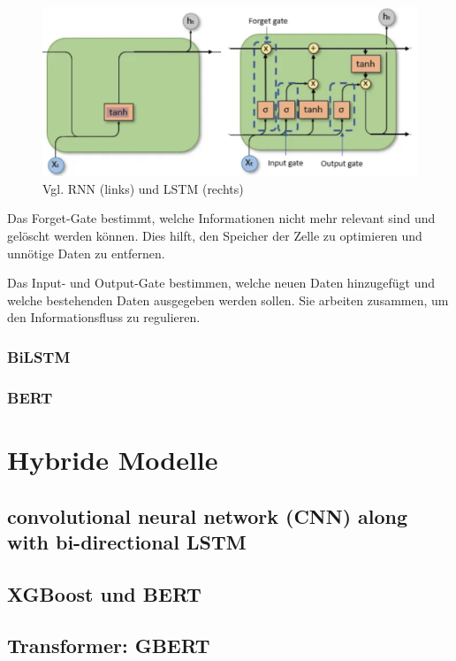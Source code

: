 \begin{figure}[htbp]
    \begin{center}
    \includegraphics[scale=0.4]{static/RNNvsLSTM.png}
    \caption[Vgl. RNN und LSTM]{Vgl. RNN (links) und LSTM (rechts) \footnotemark}\label{fig:rnnvslstm} 
    \end{center}
\end{figure}

Das Forget-Gate bestimmt, welche Informationen nicht mehr relevant sind und gelöscht werden können. 
Dies hilft, den Speicher der Zelle zu optimieren und unnötige Daten zu entfernen.

Das Input- und Output-Gate bestimmen, welche neuen Daten hinzugefügt und welche bestehenden 
Daten ausgegeben werden sollen. Sie arbeiten zusammen, um den Informationsfluss zu regulieren.

\subsubsection{BiLSTM}

\subsubsection{BERT}


\section{Hybride Modelle}
\label{sec:hybride_modelle}

\subsection{convolutional neural network (CNN) along with bi-directional LSTM}

\cite{umer2020}

\subsection{XGBoost und BERT}



\cite{sharma2025}

\cite{Buddhadev2025}

\subsection{Transformer: GBERT}

\cite{Dhiman:2024aa}

